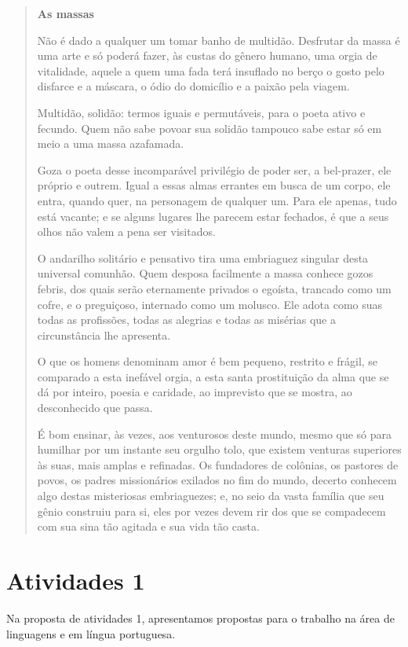 \documentclass[12pt]{extarticle}
\begin{document}
\begin{quote}
{\centering\textbf{As massas}\par}

Não é dado a qualquer um tomar banho de multidão. Desfrutar da massa é uma
arte e só poderá fazer, às custas do gênero humano, uma orgia de
vitalidade, aquele a quem uma fada terá insuflado no berço o gosto
pelo disfarce e a máscara, o ódio do domicílio e a paixão pela
viagem.

Multidão, solidão: termos iguais e permutáveis, para o poeta ativo e
fecundo. Quem não sabe povoar sua solidão tampouco sabe estar só em
meio a uma massa azafamada.

Goza o poeta desse incomparável privilégio de poder ser, a bel-prazer,
ele próprio e outrem. Igual a essas almas errantes em busca de um corpo,
ele entra, quando quer, na personagem de qualquer um. Para ele apenas, tudo
está vacante; e se alguns lugares lhe parecem estar fechados, é que a
seus olhos não valem a pena ser visitados.

O andarilho solitário e pensativo tira uma embriaguez singular desta
universal comunhão. Quem desposa facilmente a massa conhece gozos
febris, dos quais serão eternamente privados o egoísta, trancado como
um cofre, e o preguiçoso, internado como um molusco. Ele adota como
suas todas as profissões, todas as alegrias e todas as misérias que a
circunstância lhe apresenta.

O que os homens denominam amor é bem pequeno, restrito e frágil, se 
comparado a esta inefável orgia, a esta santa prostituição da alma
que se dá por inteiro, poesia e caridade, ao imprevisto que se mostra, ao
desconhecido que passa.

É bom ensinar, às vezes, aos venturosos deste mundo, mesmo que só para
humilhar por um instante seu orgulho tolo, que existem venturas
superiores às suas, mais amplas e refinadas. Os fundadores de colônias,
os pastores de povos, os padres missionários exilados no fim do mundo,
decerto conhecem algo destas misteriosas embriaguezes; e, no seio da
vasta família que seu gênio construiu para si, eles por vezes devem rir
dos que se compadecem com sua sina tão agitada e sua vida tão
casta.
\end{quote}


\section{Atividades 1}

Na proposta de atividades 1, apresentamos propostas 
para o trabalho na área de linguagens e em língua portuguesa.
\end{document}
